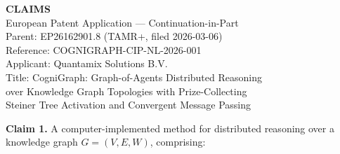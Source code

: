 \documentclass[a4paper,12pt]{article}
\begin{document}
\begin{center}
{\large\bfseries CLAIMS}\\[3mm]
{\normalsize European Patent Application --- Continuation-in-Part}\\[1mm]
{\normalsize Parent: EP26162901.8 (TAMR+, filed 2026-03-06)}\\[1mm]
{\normalsize Reference: COGNIGRAPH-CIP-NL-2026-001}\\[1mm]
{\normalsize Applicant: Quantamix Solutions B.V.}\\[1mm]
{\normalsize Title: CogniGraph: Graph-of-Agents Distributed Reasoning\\
over Knowledge Graph Topologies with Prize-Collecting\\
Steiner Tree Activation and Convergent Message Passing}
\end{center}

\vspace{8mm}


\noindent\textbf{Claim 1.} A computer-implemented method for distributed reasoning over a knowledge graph $G = (V, E, W)$, comprising:
\end{document}
